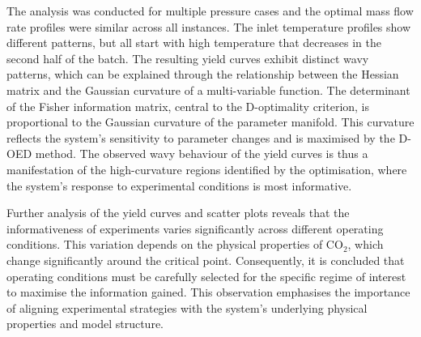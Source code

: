 \documentclass[a4paper,fleqn]{cas-dc}
\begin{document}
		The analysis was conducted for multiple pressure cases and the optimal mass flow rate profiles were similar across all instances. The inlet temperature profiles show different patterns, but all start with high temperature that decreases in	the second half of the batch. The resulting yield curves exhibit distinct wavy patterns, which can be explained through	the relationship between the Hessian matrix and the Gaussian curvature of a multi-variable function. The determinant of the Fisher information matrix, central to the D-optimality criterion, is proportional to the Gaussian curvature of the parameter manifold. This curvature reflects the system’s sensitivity to parameter changes and is maximised by the D-OED method. The observed wavy behaviour of the yield curves is thus a manifestation of the high-curvature regions identified by the optimisation, where the system’s response to experimental conditions is most informative.
		
		Further analysis of the yield curves and scatter plots reveals that the informativeness of experiments varies significantly across different operating conditions. This variation depends on the physical properties of CO$_2$, which change	significantly around the critical point. Consequently, it is concluded that operating conditions must be carefully selected for the specific regime of interest to maximise the information gained. This observation emphasises the importance of aligning experimental strategies with the system’s underlying physical properties and model structure.

%



%

\clearpage
\end{document}
